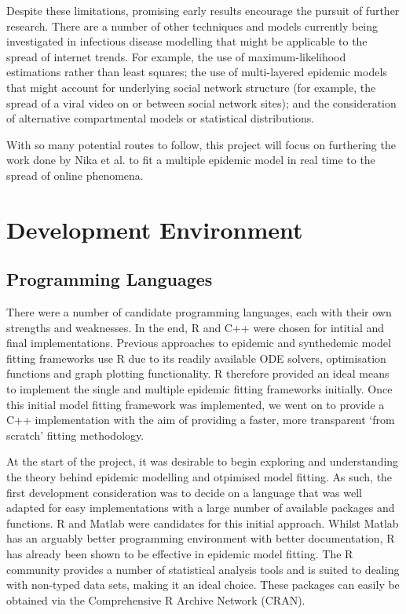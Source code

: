 Despite these limitations, promising early results encourage the
pursuit of further research. There are a number of other techniques
and models currently being investigated in infectious disease
modelling that might be applicable to the spread of internet
trends. For example, the use of maximum-likelihood estimations rather
than least squares;\cite{tizzoni} the use of multi-layered epidemic
models that might account for underlying social network structure (for
example, the spread of a viral video on or between social network
sites);\cite{altshuler, tizzoni} and the consideration of alternative
compartmental models or statistical distributions.\cite{meme}

With so many potential routes to follow, this project will focus on furthering the work done by Nika et al. to fit a multiple epidemic model in real time to the spread of online phenomena.

\section{Development Environment}
\subsection{Programming Languages}
There were a number of candidate programming languages, each with
their own strengths and weaknesses. In the end, R and C++ were chosen
for intitial and final implementations. Previous
approaches to epidemic and synthedemic model fitting frameworks use R
due to its readily available ODE solvers, optimisation functions and
graph plotting functionality.\cite{marily2013,marily2014} R therefore
provided an ideal means to implement the single and multiple epidemic
fitting frameworks initially. Once this initial model fitting
framework was implemented, we went on to provide a C++ implementation
with the aim of providing a faster, more transparent `from scratch'
fitting methodology.

At the start of the project, it was desirable to begin exploring and
understanding the theory behind epidemic modelling and otpimised model
fitting. As such, the first development consideration was to decide on
a language that was well adapted for easy implementations with a large
number of available packages and functions. R and Matlab were
candidates for this initial approach. Whilst Matlab has an arguably
better programming environment with better documentation, R has
already been shown to be effective in epidemic model fitting. The R
community provides a number of statistical analysis tools and is suited to dealing with non-typed data
sets, making it an ideal choice. These packages can easily be obtained
via the Comprehensive R Archive Network (CRAN).


